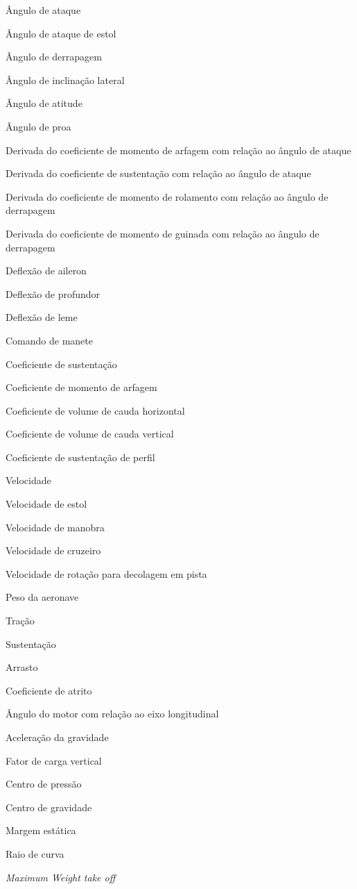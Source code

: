 
\item[$\alpha$] Ângulo de ataque
\item[$\alpha _s$] Ângulo de ataque de estol
\item[$\beta$] Ângulo de derrapagem
\item[$\varphi$] Ângulo de inclinação lateral
\item[$\theta$] Ângulo de atitude
\item[$\psi$] Ângulo de proa
\item[$C_{m_{\alpha}}$] Derivada do coeficiente de momento de arfagem com relação ao ângulo de ataque
\item[$C_{L_{\alpha}}$] Derivada do coeficiente de sustentação com relação ao ângulo de ataque
\item[$C_{l_{\beta}}$] Derivada do coeficiente de momento de rolamento com relação ao ângulo de derrapagem
\item[$C_{n_{\beta}}$] Derivada do coeficiente de momento de guinada com relação ao ângulo de derrapagem
\item[$\delta _a$] Deflexão de aileron
\item[$\delta _p$] Deflexão de profundor
\item[$\delta _l$] Deflexão de leme
\item[$\delta _m$] Comando de manete
\item[$C_L$] Coeficiente de sustentação
\item[$C_M$] Coeficiente de momento de arfagem
\item[$C_{HT}$] Coeficiente de volume de cauda horizontal
\item[$C_{VT}$] Coeficiente de volume de cauda vertical
\item[$c_l$] Coeficiente de sustentação de perfil
\item[$V$] Velocidade
\item[$V_{stall}$] Velocidade de estol
\item[$V_{man}$] Velocidade de manobra
\item[$V_{cruz}$] Velocidade de cruzeiro
\item[$V_{r}$] Velocidade de rotação para decolagem em pista
\item[$W$] Peso da aeronave
\item[$T$] Tração
\item[$L$] Sustentação
\item[$D$] Arrasto
\item[$\mu$] Coeficiente de atrito
\item[$\alpha _F$] Ângulo do motor com relação ao eixo longitudinal
\item[$g$] Aceleração da gravidade
\item[$n_z$] Fator de carga vertical
\item[$CP$] Centro de pressão
\item[$CG$] Centro de gravidade
\item[$ME$] Margem estática
\item[$R$] Raio de curva
\item[$MTOW$] \textit{Maximum Weight take off}

